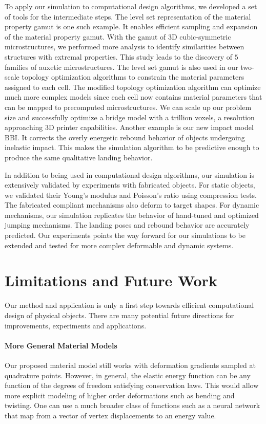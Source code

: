 To apply our simulation to computational design algorithms, we developed a set of tools for the intermediate steps.
The level set representation of the material property gamut is one such example.
It enables efficient sampling and expansion of the material property gamut.
With the gamut of 3D cubic-symmetric microstructures, we performed more analysis to identify similarities between structures with extremal properties.
This study leads to the discovery of $5$ families of auxetic microstructures.
The level set gamut is also used in our two-scale topology optimization algorithms to constrain the material parameters assigned to each cell.
The modified topology optimization algorithm can optimize much more complex models since each cell now contains material parameters that can be mapped to precomputed microstructures.
We can scale up our problem size and successfully optimize a bridge model with a trillion voxels, a resolution approaching 3D printer capabilities.
Another example is our new impact model BBI.
It corrects the overly energetic rebound behavior of objects undergoing inelastic impact.
This makes the simulation algorithm to be predictive enough to produce the same qualitative landing behavior.

In addition to being used in computational design algorithms, our simulation is extensively validated by experiments with fabricated objects.
For static objects, we validated their Young's modulus and Poisson's ratio using compression tests.
The fabricated compliant mechanisms also deform to target shapes.
For dynamic mechanisms, our simulation replicates the behavior of hand-tuned and optimized jumping mechanisms.
The landing poses and rebound behavior are accurately predicted.
Our experiments points the way forward for our simulations to be extended and tested for more complex deformable and dynamic systems.

\section{Limitations and Future Work}
Our method and application is only a first step towards efficient computational design of physical objects.
There are many potential future directions for improvements, experiments and applications.
\paragraph{More General Material Models}
Our proposed material model still works with deformation gradients sampled at quadrature points.
However, in general, the elastic energy function can be any function of the degrees of freedom satisfying conservation laws.
This would allow more explicit modeling of higher order deformations such as bending and twisting.
One can use a much broader class of functions such as a neural network that map from a vector of vertex displacements to an energy value.
